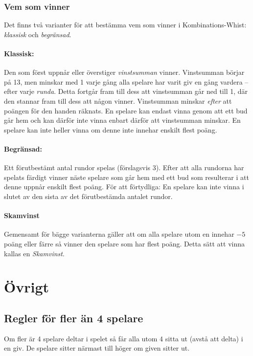 \documentclass[a4paper]{article} %
\begin{document}
	\subsubsection{Vem som vinner}
	\label{sec:winning}
	Det finns två varianter för att bestämma vem som vinner i Kombinations-Whist: \emph{klassisk} och \emph{begränsad}.

	\paragraph{Klassisk:}
	Den som först uppnår eller överstiger \emph{vinstsumman} vinner. Vinstsumman börjar på 13, men minskar med 1 varje gång alla spelare har varit giv en gång vardera -- efter varje \emph{runda}. Detta fortgår fram till dess att vinstsumman går ned till 1, där den stannar fram till dess att någon vinner. Vinstsumman minskar \emph{efter} att poängen för den handen räknats. En spelare kan endast vinna genom att ett bud går hem och kan därför inte vinna enbart därför att vinstsumman minskar. En spelare kan inte heller vinna om denne inte innehar enskilt flest poäng.

	\paragraph{Begränsad:}
	Ett förutbestämt antal rundor spelas (förslagsvis 3). Efter att alla rundorna har spelats färdigt vinner näste spelare som går hem med ett bud som resulterar i att denne uppnår enskilt flest poäng. För att förtydliga: En spelare kan inte vinna i slutet av den sista av det förutbestämda antalet rundor.

	\paragraph{Skamvinst} Gemensamt för bägge varianterna gäller att om alla spelare utom en innehar $-5$ poäng eller färre så vinner den spelare som har flest poäng. Detta sätt att vinna kallas en \emph{Skamvinst}.

	\section{Övrigt}
	\subsection{Regler för fler än 4 spelare}
	Om fler är 4 spelare deltar i spelet så får alla utom 4 sitta ut (avstå att delta) i en giv. De spelare sitter närmast till höger om given sitter ut.
		
\end{document}
